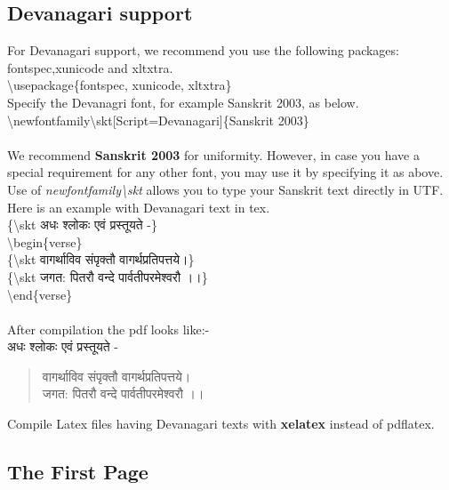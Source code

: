 \documentclass[11pt]{article}
\begin{document}
\subsection{Devanagari support}
For Devanagari support, we recommend you use the following packages: \\
fontspec,xunicode and xltxtra. \\

\textbackslash usepackage\{fontspec, xunicode, xltxtra\}\\

Specify the Devanagri font, for example Sanskrit 2003, as below.\\

\textbackslash newfontfamily\textbackslash skt[Script=Devanagari]\{Sanskrit 2003\}\\ \\

We recommend {\bf Sanskrit 2003} for uniformity. However, in case you have a special requirement for any other font, you may use it by specifying it as above.\\

Use of {\it newfontfamily\textbackslash skt} allows you to type your Sanskrit text directly in UTF.\\

Here is an example with Devanagari text in tex.\\
\{\textbackslash skt {\skt अधः श्लोकः एवं प्रस्तूयते -}\}\\
\textbackslash begin\{verse\}\\
\{\textbackslash skt {\skt वागर्थाविव संपृक्तौ वागर्थप्रतिपत्तये।}\}\\
\{\textbackslash skt {\skt जगत: पितरौ वन्दे पार्वतीपरमेश्वरौ ।।}\}\\
\textbackslash end\{verse\}\\\\

After compilation the pdf looks like:- \\

{\skt अधः श्लोकः एवं प्रस्तूयते -}
\begin{verse}
{\skt वागर्थाविव संपृक्तौ वागर्थप्रतिपत्तये।}\\
{\skt जगत: पितरौ वन्दे पार्वतीपरमेश्वरौ ।।}
\end{verse}

Compile Latex files having Devanagari texts with {\bf xelatex} instead of pdflatex.

\subsection{The First Page}
\label{ssec:first}
\end{document}
